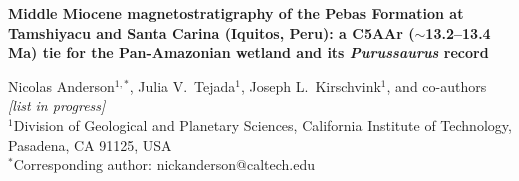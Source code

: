 \documentclass[12pt]{article}
\begin{document}
\begin{flushleft}
{\color{leadtitle}\sffamily\bfseries\fontsize{17}{21}\selectfont Middle Miocene
magnetostratigraphy of the Pebas Formation at Tamshiyacu and Santa Carina (Iquitos, Peru):
a C5AAr ($\sim$13.2--13.4 Ma) tie for the Pan-Amazonian wetland and its
\textit{Purussaurus} record\par}
\vspace{8pt}
Nicolas Anderson$^{1,*}$, Julia V.\ Tejada$^{1}$, Joseph L.\ Kirschvink$^{1}$, and
co-authors \textit{[list in progress]}\\[3pt]
{\small $^{1}$Division of Geological and Planetary Sciences, California Institute of
Technology, Pasadena, CA 91125, USA}\\[2pt]
{\small $^{*}$Corresponding author: nickanderson@caltech.edu}
\end{flushleft}

\begin{center}\end{center}
\end{document}
